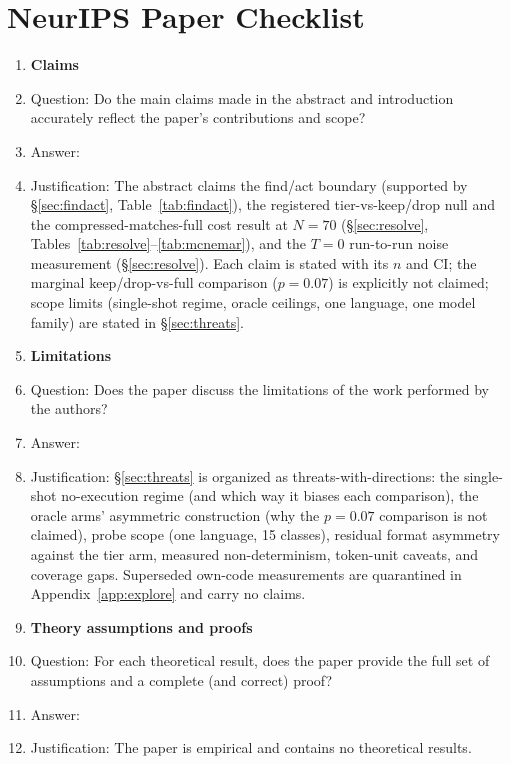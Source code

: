 \section*{NeurIPS Paper Checklist}

\begin{enumerate}

\item {\bf Claims}
    \item[] Question: Do the main claims made in the abstract and introduction accurately reflect the paper's contributions and scope?
    \item[] Answer: \answerYes{}
    \item[] Justification: The abstract claims the find/act boundary (supported by \S\ref{sec:findact}, Table~\ref{tab:findact}), the registered tier-vs-keep/drop null and the compressed-matches-full cost result at $N{=}70$ (\S\ref{sec:resolve}, Tables~\ref{tab:resolve}--\ref{tab:mcnemar}), and the $T{=}0$ run-to-run noise measurement (\S\ref{sec:resolve}). Each claim is stated with its $n$ and CI; the marginal keep/drop-vs-full comparison ($p{=}0.07$) is explicitly not claimed; scope limits (single-shot regime, oracle ceilings, one language, one model family) are stated in \S\ref{sec:threats}.

\item {\bf Limitations}
    \item[] Question: Does the paper discuss the limitations of the work performed by the authors?
    \item[] Answer: \answerYes{}
    \item[] Justification: \S\ref{sec:threats} is organized as threats-with-directions: the single-shot no-execution regime (and which way it biases each comparison), the oracle arms' asymmetric construction (why the $p{=}0.07$ comparison is not claimed), probe scope (one language, 15 classes), residual format asymmetry against the tier arm, measured non-determinism, token-unit caveats, and coverage gaps. Superseded own-code measurements are quarantined in Appendix~\ref{app:explore} and carry no claims.

\item {\bf Theory assumptions and proofs}
    \item[] Question: For each theoretical result, does the paper provide the full set of assumptions and a complete (and correct) proof?
    \item[] Answer: \answerNA{}
    \item[] Justification: The paper is empirical and contains no theoretical results.


\end{enumerate}
